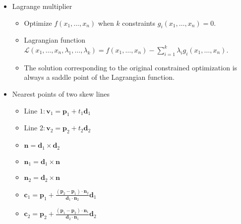 \begin{itemize}
\item Lagrange multiplier

\begin{itemize}
  \item Optimize $f(x_1, \ldots, x_n)$ when $k$ constraints $g_i(x_1, \ldots, x_n)=0$.
  \item Lagrangian function $\mathcal{L}(x_1, \ldots, x_n, \lambda_1, \ldots, \lambda_k) = f(x_1, \ldots, x_n) - \sum^{k}_{i=1}\lambda_i g_i(x_1, \ldots, x_n)$.
  \item The solution corresponding to the original constrained optimization is always a saddle point of the Lagrangian function.
\end{itemize}

\item Nearest points of two skew lines

\begin{itemize}
\item $\text{Line 1}: \boldsymbol{v}_1 = \boldsymbol{p}_1 + t_1\boldsymbol{d}_1$
\item $\text{Line 2}: \boldsymbol{v}_2 = \boldsymbol{p}_2 + t_2\boldsymbol{d}_2$
\item $\boldsymbol{n} = \boldsymbol{d}_1\times \boldsymbol{d}_2$
\item $\boldsymbol{n}_1 = \boldsymbol{d}_1 \times \boldsymbol{n}$
\item $\boldsymbol{n}_2 = \boldsymbol{d}_2 \times \boldsymbol{n}$
\item $\boldsymbol{c}_1 = \boldsymbol{p}_1 + \frac{(\boldsymbol{p}_2 - \boldsymbol{p}_1)\cdot\boldsymbol{n}_2}{\boldsymbol{d}_1\cdot\boldsymbol{n}_2}\boldsymbol{d}_1$
\item $\boldsymbol{c}_2 = \boldsymbol{p}_2 + \frac{(\boldsymbol{p}_1 - \boldsymbol{p}_2)\cdot\boldsymbol{n}_1}{\boldsymbol{d}_2\cdot\boldsymbol{n}_1}\boldsymbol{d}_2$
\end{itemize}

\end{itemize}
